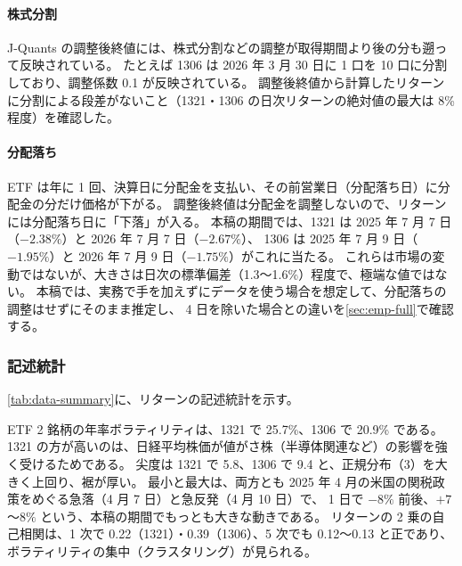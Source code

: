 \paragraph{株式分割}
J-Quants の調整後終値には、株式分割などの調整が取得期間より後の分も遡って反映されている。
たとえば 1306 は 2026 年 3 月 30 日に 1 口を 10 口に分割しており、調整係数 0.1 が反映されている。
調整後終値から計算したリターンに分割による段差がないこと（1321・1306 の日次リターンの絶対値の最大は 8\% 程度）を確認した。

\paragraph{分配落ち}
ETF は年に 1 回、決算日に分配金を支払い、その前営業日（分配落ち日）に分配金の分だけ価格が下がる。
調整後終値は分配金を調整しないので、リターンには分配落ち日に「下落」が入る。
本稿の期間では、1321 は 2025 年 7 月 7 日（$-2.38\%$）と 2026 年 7 月 7 日（$-2.67\%$）、
1306 は 2025 年 7 月 9 日（$-1.95\%$）と 2026 年 7 月 9 日（$-1.75\%$）がこれに当たる。
これらは市場の変動ではないが、大きさは日次の標準偏差（1.3〜1.6\%）程度で、極端な値ではない。
本稿では、実務で手を加えずにデータを使う場合を想定して、分配落ちの調整はせずにそのまま推定し、
4 日を除いた場合との違いを\cref{sec:emp-full}で確認する。

\subsubsection{記述統計}

\cref{tab:data-summary}に、リターンの記述統計を示す。

\begin{table}[tbp]
  \centering
  \caption{日次リターン（\%、平均除去前）の記述統計（2024 年 9 月 3 日〜2026 年 8 月 31 日）。
    年率ボラは標準偏差 $\times \sqrt{252}$、尖度は正規分布で 3。
    $\rho_k(y^2)$ はリターンの 2 乗の $k$ 次の自己相関。
    Core30 の行は 30 銘柄の値の中央値と、銘柄間の最小・最大（列ごとに別の銘柄でありうる）。}
  \label{tab:data-summary}
  \small
  \setlength{\tabcolsep}{4pt}
  
\end{table}

ETF 2 銘柄の年率ボラティリティは、1321 で 25.7\%、1306 で 20.9\% である。
1321 の方が高いのは、日経平均株価が値がさ株（半導体関連など）の影響を強く受けるためである。
尖度は 1321 で 5.8、1306 で 9.4 と、正規分布（3）を大きく上回り、裾が厚い。
最小と最大は、両方とも 2025 年 4 月の米国の関税政策をめぐる急落（4 月 7 日）と急反発（4 月 10 日）で、
1 日で $-8\%$ 前後、$+7$〜$8\%$ という、本稿の期間でもっとも大きな動きである。
リターンの 2 乗の自己相関は、1 次で 0.22（1321）・0.39（1306）、5 次でも 0.12〜0.13 と正であり、ボラティリティの集中（クラスタリング）が見られる。

